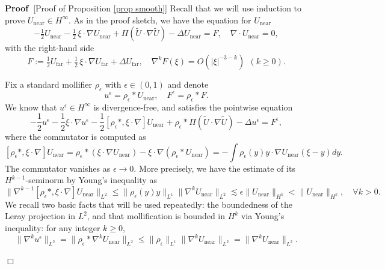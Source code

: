 \documentclass[11pt,a4paper]{article}
\numberwithin{equation}{section}
\newcommand{\cdummy}{\cdot}
\newcommand{\tmop}[1]{\ensuremath{\operatorname{#1}}}
\newenvironment{proof}{\noindent\textbf{Proof\ }}{\hspace*{\fill}$\Box$\medskip}
\begin{document}
\begin{proof}[Proof of Proposition \ref{prop smooth}]
Recall that we will use induction to prove $U_{\mathrm{near}}\in H^\infty$. As in the proof sketch, we have the equation for $U_{\mathrm{near}}$
  \begin{equation}
     -\tfrac12 U_{\mathrm{near}}-\tfrac12\,\xi\cdot\nabla U_{\mathrm{near}}
+\Pi(\widetilde U\cdot\nabla\widetilde U)-\Delta U_{\mathrm{near}}=F,
\quad
\nabla\cdot U_{\mathrm{near}}=0,
     \label{eqn for unear}
  \end{equation} 
  with the right-hand side
  \begin{equation}
       \label{Definition-F}F:=\tfrac12U_{\mathrm{far}}+\tfrac12\,\xi\cdot\nabla U_{\mathrm{far}}+\Delta U_{\mathrm{far}},
\quad
\nabla^k F(\xi)=O(|\xi|^{-3-k}) \ \ (k\geqslant0). 
  \end{equation} 
  
 Fix a standard mollifier $\rho_\epsilon$ with $\epsilon \in (0,1)$ and denote \begin{equation}
     \label{defintion-ueps-Feps}
     u^\epsilon=\rho_\epsilon * U_{\tmop{near}}, \quad F^\epsilon=\rho_\epsilon * F .
     \end{equation} We know that $ u^\epsilon\in H^\infty$ is divergence-free, and satisfies the pointwise equation 
     \begin{equation}
- \frac{1}{2} u^\epsilon - \frac{1}{2} \xi \cdummy \nabla
       u^\epsilon -\frac{1}{2}[\rho_\epsilon *,\xi\cdot\nabla]U_{\tmop{near}}+ \rho_\epsilon *\Pi (\widetilde{U} \cdot \nabla \widetilde{U}) - \Delta
       u^\epsilon = F^\epsilon,
     \label{pre:mol}
  \end{equation} 
 where the commutator is computed as \[[\rho_\epsilon *,\xi\cdot\nabla]U_{\tmop{near}}=\rho_\epsilon *(\xi\cdot\nabla U_{\tmop{near}})-\xi\cdot\nabla(\rho_\epsilon *U_{\tmop{near}})=- \int\rho_\epsilon(y)y \cdummy \nabla
       U_{\tmop{near}}(\xi-y)dy.\]
      The commutator vanishes as $\epsilon\to0$.
       More precisely, we have the estimate of its $H^{k-1}$-seminorm by Young's inequality as \begin{equation}
           \label{commute est}
           \|\nabla^{k-1}[\rho_\epsilon *,\xi\cdot\nabla]U_{\tmop{near}}\|_{L^2}\leqslant\|\rho_\epsilon(y)y\|_{L^1}\|\nabla^{k}U_{\tmop{near}}\|_{L^2}\lesssim\epsilon\|U_{\mathrm{near}}\|_{H^{k}}<\|U_{\mathrm{near}}\|_{H^{k}},\quad \forall k>0.
       \end{equation}
        We recall two basic facts that will be used repeatedly: the boundedness of the Leray projection in $L^2$, and that 
 mollification is bounded in $H^k$ via
   Young's inequality: for any integer $k \geqslant 0$,
   \begin{equation}
   \label{Basic-tool}
   \|\nabla^k u^\epsilon\|_{L^2}
   = \|\rho_\epsilon * \nabla^k U_{\mathrm{near}}\|_{L^2}
   \leqslant\|\rho_\epsilon\|_{L^1}  \|\nabla^k U_{\mathrm{near}}\|_{L^2}
   = \|\nabla^k U_{\mathrm{near}}\|_{L^2}.
   \end{equation}


\end{proof}
\end{document}
